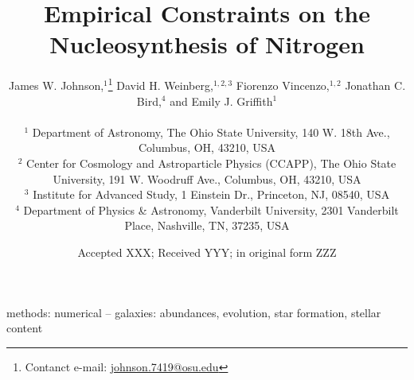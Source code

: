 \documentclass[fleqn, usenatbib]{mnras}
\title[Empirical Constraints on the Nucleosynthesis of Nitrogen]{Empirical 
Constraints on the Nucleosynthesis of Nitrogen}
\author[J.W. Johnson et al.]{James W. Johnson,$^{1}$\thanks{
	Contanct e-mail: \href{mailto:
	johnson.7419@osu.edu}{johnson.7419@osu.edu}} 
	David H. Weinberg,$^{1, 2, 3}$ 
	Fiorenzo Vincenzo,$^{1, 2}$ 
	Jonathan C. Bird,$^{4}$ 
	\newauthor 
	and Emily J. Griffith$^{1}$ 
	\\ \null \\ 
	$^{1}$ Department of Astronomy, The Ohio State University, 
	140 W. 18th Ave., Columbus, OH, 43210, USA 
	\\ 
	$^{2}$ Center for Cosmology and Astroparticle Physics (CCAPP), 
	The Ohio State University, 191 W. Woodruff Ave., Columbus, OH, 43210, USA 
	\\ 
	$^{3}$ Institute for Advanced Study, 1 Einstein Dr., Princeton, NJ, 08540, 
	USA 
	\\ 
	$^{4}$ Department of Physics \& Astronomy, Vanderbilt University, 
	2301 Vanderbilt Place, Nashville, TN, 37235, USA 
}
\date{Accepted XXX; Received YYY; in original form ZZZ}
\begin{document}
 
\label{firstpage} 
\pagerange{\pageref{firstpage}--\pageref{lastpage}} 
\maketitle 

 

\begin{keywords} 
methods: numerical -- galaxies: abundances, evolution, star formation, stellar 
content 
\end{keywords} 

 
 
 
 
 
 

 
 

\begin{appendices}

\end{appendices}

\label{lastpage} 
\end{document}
